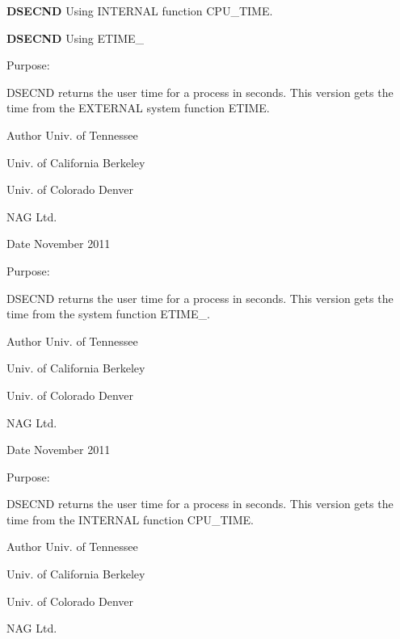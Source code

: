 {\bfseries D\+S\+E\+C\+N\+D} Using I\+N\+T\+E\+R\+N\+A\+L function C\+P\+U\+\_\+\+T\+I\+M\+E.

{\bfseries D\+S\+E\+C\+N\+D} Using E\+T\+I\+M\+E\+\_\+

\begin{DoxyParagraph}{Purpose\+: }
\begin{DoxyVerb}  DSECND returns the user time for a process in seconds.
  This version gets the time from the EXTERNAL system function ETIME.\end{DoxyVerb}
 
\end{DoxyParagraph}
\begin{DoxyAuthor}{Author}
Univ. of Tennessee 

Univ. of California Berkeley 

Univ. of Colorado Denver 

N\+A\+G Ltd. 
\end{DoxyAuthor}
\begin{DoxyDate}{Date}
November 2011
\end{DoxyDate}
\begin{DoxyParagraph}{Purpose\+: }
\begin{DoxyVerb}  DSECND returns the user time for a process in seconds.
  This version gets the time from the system function ETIME_.\end{DoxyVerb}
 
\end{DoxyParagraph}
\begin{DoxyAuthor}{Author}
Univ. of Tennessee 

Univ. of California Berkeley 

Univ. of Colorado Denver 

N\+A\+G Ltd. 
\end{DoxyAuthor}
\begin{DoxyDate}{Date}
November 2011
\end{DoxyDate}
\begin{DoxyParagraph}{Purpose\+: }
\begin{DoxyVerb}  DSECND returns the user time for a process in seconds.
  This version gets the time from the INTERNAL function CPU_TIME.\end{DoxyVerb}
 
\end{DoxyParagraph}
\begin{DoxyAuthor}{Author}
Univ. of Tennessee 

Univ. of California Berkeley 

Univ. of Colorado Denver 

N\+A\+G Ltd. 
\end{DoxyAuthor}
